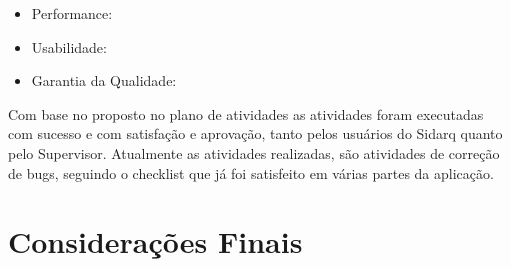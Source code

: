 \begin{itemize}
    \item Performance:
    
    \item Usabilidade:


	\item Garantia da Qualidade:
\end{itemize}

Com base no proposto no plano de atividades as atividades foram executadas com sucesso e com satisfação e aprovação, tanto pelos usuários do Sidarq quanto pelo Supervisor. Atualmente as atividades realizadas, são atividades de correção de bugs, seguindo o checklist que já foi satisfeito em várias partes da aplicação.

\chapter[Considerações Finais]{Considerações Finais}

